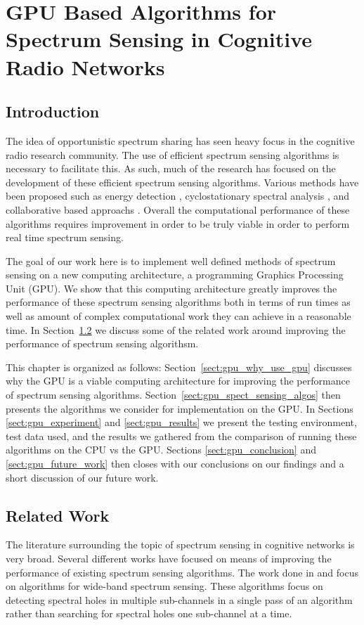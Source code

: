 \chapter{GPU Based Algorithms for Spectrum Sensing in Cognitive Radio Networks}
\label{chap:cognet_gpu}
\section{Introduction}
The idea of opportunistic spectrum sharing has seen heavy focus in the cognitive radio research community.  The use of efficient spectrum sensing algorithms is necessary to facilitate this.  As such, much of the research has focused on the development of these efficient spectrum sensing algorithms.  Various methods have been proposed such as energy detection \cite{CabTkaBro06}\cite{HurParWoo06}, cyclostationary spectral analysis \cite{FenBos07}\cite{OshClaEbe07}, and collaborative based approachs \cite{GanLi05}\cite{SadAzm08}.  Overall the computational performance of these algorithms requires improvement in order to be truly viable in order to perform real time spectrum sensing.

The goal of our work here is to implement well defined methods of spectrum sensing on a new computing architecture, a programming Graphics Processing Unit (GPU).  We show that this computing architecture greatly improves the performance of these spectrum sensing algorithms both in terms of run times as well as amount of complex computational work they can achieve in a reasonable time.  In Section~\ref{sect:gpu_related_work} we discuss some of the related work around improving the performance of spectrum sensing algorithsm.  

This chapter is organized as follows: Section~\ref{sect:gpu_why_use_gpu} discusses why the GPU is a viable computing architecture for improving the performance of spectrum sensing algorithms.  Section~\ref{sect:gpu_spect_sensing_algos} then presents the algorithms we consider for implementation on the GPU.  In Sections \ref{sect:gpu_experiment} and \ref{sect:gpu_results} we present the testing environment, test data used, and the results we gathered from the comparison of running these algorithms on the CPU vs the GPU.  Sections \ref{sect:gpu_conclusion} and \ref{sect:gpu_future_work} then closes with our conclusions on our findings and a short discussion of our future work.

\section{Related Work}
\label{sect:gpu_related_work}
The literature surrounding the topic of spectrum sensing in cognitive networks is very broad.  Several different works have focused on means of improving the performance of existing spectrum sensing algorithms.  The work done in \cite{HurParWoo06} and \cite{QuaCuiSay08} focus on algorithms for wide-band spectrum sensing.  These algorithms focus on detecting spectral holes in multiple sub-channels in a single pass of an algorithm rather than searching for spectral holes one sub-channel at a time.

